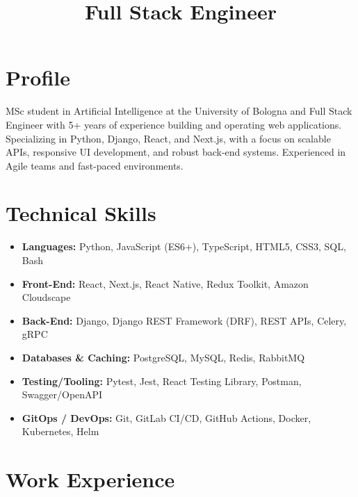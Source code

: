 \documentclass[11pt,a4paper,sans]{moderncv}
\title{Full Stack Engineer} %
\begin{document}
\makecvtitle

\vspace {-2em}

\section{Profile}
\vspace{-1mm}
MSc student in Artificial Intelligence at the University of Bologna and Full Stack Engineer with 5+ years of experience building and operating web applications. Specializing in Python, Django, React, and Next.js, with a focus on scalable APIs, responsive UI development, and robust back-end systems. Experienced in Agile teams and fast-paced environments.




\section{Technical Skills}
\begin{itemize}
    \item \textbf{Languages:} Python, JavaScript (ES6+), TypeScript, HTML5, CSS3, SQL, Bash
    \item \textbf{Front-End:} React, Next.js, React Native, Redux Toolkit, Amazon Cloudscape
    \item \textbf{Back-End:} Django, Django REST Framework (DRF), REST APIs, Celery, gRPC
    \item \textbf{Databases \& Caching:} PostgreSQL, MySQL, Redis, RabbitMQ
    \item \textbf{Testing/Tooling:} Pytest, Jest, React Testing Library, Postman, Swagger/OpenAPI
    \item \textbf{GitOps / DevOps:} Git, GitLab CI/CD, GitHub Actions, Docker, Kubernetes, Helm
\end{itemize}




\section{Work Experience}
\vspace{1mm}
\end{document}
